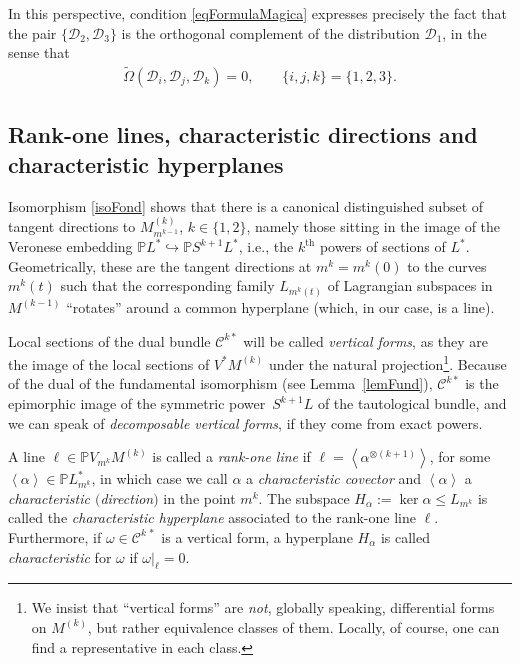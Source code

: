 \documentclass[10pt,a4paper]{amsart}
\newcommand{\C}{\mathcal{C}}
\newcommand{\D}{\mathcal{D}}
\newcommand{\Span}[1]{\left\langle #1 \right\rangle}
\renewcommand{\P}{\mathbb{P}}
\newcommand{\Th}{^\textrm{th}}
\numberwithin{equation}{section}
\begin{document}
\begin{Remark}\label{remFomulaMagicaIntrinseca}
In this perspective, condition \eqref{eqFormulaMagica} expresses precisely the fact that the pair $\{\D_2,\D_3\}$ is the orthogonal complement of the distribution $\D_1$, in the sense that
\begin{gather*}
\widetilde{\Omega}(\D_i,\D_j,\D_k)=0,\qquad \{i,j,k\}=\{1,2,3\}.
\end{gather*}
\end{Remark}

\subsection{Rank-one lines, characteristic directions and characteristic hyperplanes}\label{subsubRankUnoChar}

Isomorphism \eqref{isoFond} shows that there is a canonical distinguished subset of tangent directions to $M^{(k)}_{m^{k-1}}$, $k\in\{1,2\}$, namely those sitting in the image of the Veronese embedding $\P L^\ast\hookrightarrow \P S^{k+1}L^\ast$, i.e., the $k\Th$ powers of sections of $L^\ast $. Geometrically, these are the tangent directions at $m^k=m^k(0)$ to the curves $m^k(t)$ such that the corresponding family $L_{m^k(t)}$ of Lagrangian subspaces in $M^{(k-1)}$ ``rotates'' around a common hyperplane (which, in our case, is a line).

Local sections of the dual bundle $\C^{k\ast}$ will be called \emph{vertical forms}, as they are the image of the local sections of $V^*M^{(k)}$ under the natural projection\footnote{We insist that ``vertical forms'' are \emph{not}, globally speaking, dif\/ferential forms on $M^{(k)}$, but rather equivalence classes of them. Locally, of course, one can f\/ind a representative in each class.}. Because of the dual of the fundamental isomorphism (see Lemma~\ref{lemFund}), $\C^{k\ast}$ is the epimorphic image of the symmetric power~$S^{k+1}L$ of the tautological bundle, and we can speak of \emph{decomposable vertical forms}, if they come from exact powers.

\begin{Definition}\label{defRankOneLine}
 A line $\ell\in \mathbb{P}V_{m^k}M^{(k)}$ is called a \emph{rank-one line} if $\ell=\Span{\alpha^{\otimes (k+1)}}$, for some $\Span{\alpha}\in \P L_{m^k}^\ast$, in which case we call $\alpha$ a \emph{characteristic covector} and $\Span{\alpha}$ a \emph{characteristic $($direction$)$} in the point $m^k$. The subspace $H_\alpha:=\ker\alpha\leq L_{m^k}$ is called the \emph{characteristic hyperplane} associated to the rank-one line $\ell$. Furthermore, if $\omega\in\C^{k\,\ast}$ is a vertical form, a hyperplane $H_\alpha$ is called \emph{characteristic} for $\omega$ if $\omega|_\ell=0$.
\end{Definition}
\end{document}
